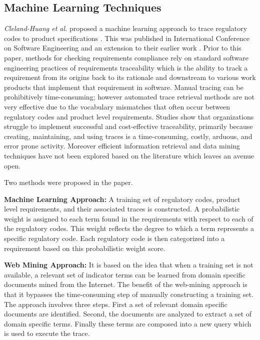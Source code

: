 \documentclass{report}
\begin{document}
\subsection{Machine Learning Techniques}
\label{sec:MLTechs}
\textit{Cleland-Huang et al.} proposed a machine learning approach to trace regulatory codes to product
specifications \cite{clelandHuang10}. This was published in International Conference on Software Engineering
and an extension to their earlier work \cite{clelandHuang05}.
Prior to this paper, methods for checking requirements compliance rely on standard software engineering practices of requirements traceability which is the ability to track a requirement from its origins back to its rationale and downstream to various work products that implement that requirement in software. Manual tracing can be prohibitively time-consuming; however automated trace retrieval methods are not very effective due to the vocabulary mismatches that often occur between regulatory codes and product level requirements. Studies show that organizations struggle to implement successful and cost-effective traceability, primarily because creating, maintaining, and using traces is a time-consuming, costly, arduous, and error prone activity. Moreover efficient information retrieval and data mining techniques have not been explored based on the literature which leaves an avenue open.

Two methods were proposed in the paper.

\textbf{Machine Learning Approach:} A training set of regulatory codes, product level requirements, and
their associated traces is constructed. A probabilistic weight is assigned to each term found in the
requirements with respect to each of the regulatory codes. This weight reflects the degree to which
a term represents a specific regulatory code. Each regulatory code is then categorized into a requirement 
based on this probabilistic weight score.

\textbf{Web Mining Approach:} It is based on the idea that when a training set is not available, a 
relevant set of indicator terms can be learned from domain specific documents mined from the Internet.
The benefit of the web-mining approach is that it bypasses the time-consuming step of manually constructing
a training set. The approach involves three steps. First a set of relevant domain specific documents are
identified. Second, the documents are analyzed to extract a set of domain specific terms. Finally these
terms are composed into a new query which is used to execute the trace.
\end{document}
